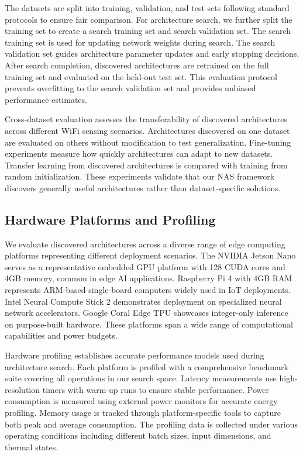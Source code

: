 \documentclass[journal]{IEEEtran}
\begin{document}
The datasets are split into training, validation, and test sets following standard protocols to ensure fair comparison. For architecture search, we further split the training set to create a search training set and search validation set. The search training set is used for updating network weights during search. The search validation set guides architecture parameter updates and early stopping decisions. After search completion, discovered architectures are retrained on the full training set and evaluated on the held-out test set. This evaluation protocol prevents overfitting to the search validation set and provides unbiased performance estimates.

Cross-dataset evaluation assesses the transferability of discovered architectures across different WiFi sensing scenarios. Architectures discovered on one dataset are evaluated on others without modification to test generalization. Fine-tuning experiments measure how quickly architectures can adapt to new datasets. Transfer learning from discovered architectures is compared with training from random initialization. These experiments validate that our NAS framework discovers generally useful architectures rather than dataset-specific solutions.

\subsection{Hardware Platforms and Profiling}

We evaluate discovered architectures across a diverse range of edge computing platforms representing different deployment scenarios. The NVIDIA Jetson Nano serves as a representative embedded GPU platform with 128 CUDA cores and 4GB memory, common in edge AI applications. Raspberry Pi 4 with 4GB RAM represents ARM-based single-board computers widely used in IoT deployments. Intel Neural Compute Stick 2 demonstrates deployment on specialized neural network accelerators. Google Coral Edge TPU showcases integer-only inference on purpose-built hardware. These platforms span a wide range of computational capabilities and power budgets.

Hardware profiling establishes accurate performance models used during architecture search. Each platform is profiled with a comprehensive benchmark suite covering all operations in our search space. Latency measurements use high-resolution timers with warm-up runs to ensure stable performance. Power consumption is measured using external power monitors for accurate energy profiling. Memory usage is tracked through platform-specific tools to capture both peak and average consumption. The profiling data is collected under various operating conditions including different batch sizes, input dimensions, and thermal states.
\end{document}
